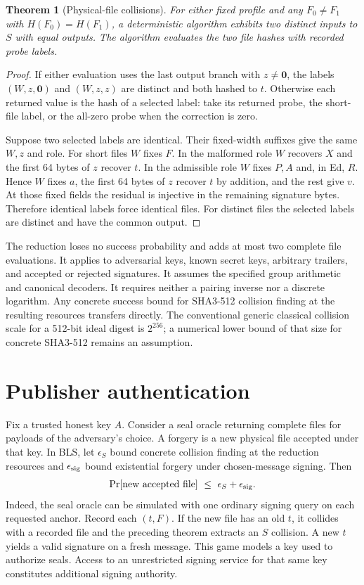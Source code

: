 \documentclass[10pt,twocolumn,letterpaper]{article}
\newtheorem{theorem}{Theorem}
\newcommand{\zeros}{\mathbf{0}}
\begin{document}
\begin{theorem}[Physical-file collisions]
For either fixed profile and any $F_0\ne F_1$ with $H(F_0)=H(F_1)$, a deterministic algorithm exhibits two distinct inputs to $S$ with equal outputs. The algorithm evaluates the two file hashes with recorded probe labels.
\end{theorem}
\begin{proof}
If either evaluation uses the last output branch with $z\ne\zeros$, the labels $(W,z,\zeros)$ and $(W,z,z)$ are distinct and both hashed to $t$. Otherwise each returned value is the hash of a selected label: take its returned probe, the short-file label, or the all-zero probe when the correction is zero.

Suppose two selected labels are identical. Their fixed-width suffixes give the same $W,z$ and role. For short files $W$ fixes $F$. In the malformed role $W$ recovers $X$ and the first 64 bytes of $z$ recover $t$. In the admissible role $W$ fixes $P,A$ and, in Ed, $R$. Hence $W$ fixes $a$, the first 64 bytes of $z$ recover $t$ by addition, and the rest give $v$. At those fixed fields the residual is injective in the remaining signature bytes. Therefore identical labels force identical files. For distinct files the selected labels are distinct and have the common output.
\end{proof}

The reduction loses no success probability and adds at most two complete file evaluations. It applies to adversarial keys, known secret keys, arbitrary trailers, and accepted or rejected signatures. It assumes the specified group arithmetic and canonical decoders. It requires neither a pairing inverse nor a discrete logarithm. Any concrete success bound for SHA3-512 collision finding at the resulting resources transfers directly. The conventional generic classical collision scale for a 512-bit ideal digest is $2^{256}$; a numerical lower bound of that size for concrete SHA3-512 remains an assumption.

\section{Publisher authentication}
Fix a trusted honest key $A$. Consider a seal oracle returning complete files for payloads of the adversary's choice. A forgery is a new physical file accepted under that key. In BLS, let $\epsilon_S$ bound concrete collision finding at the reduction resources and $\epsilon_{\rm sig}$ bound existential forgery under chosen-message signing. Then
\[
 \Pr[\text{new accepted file}]\ \le\ \epsilon_S+\epsilon_{\rm sig}.
\]
Indeed, the seal oracle can be simulated with one ordinary signing query on each requested anchor. Record each $(t,F)$. If the new file has an old $t$, it collides with a recorded file and the preceding theorem extracts an $S$ collision. A new $t$ yields a valid signature on a fresh message. This game models a key used to authorize seals. Access to an unrestricted signing service for that same key constitutes additional signing authority.
\end{document}
